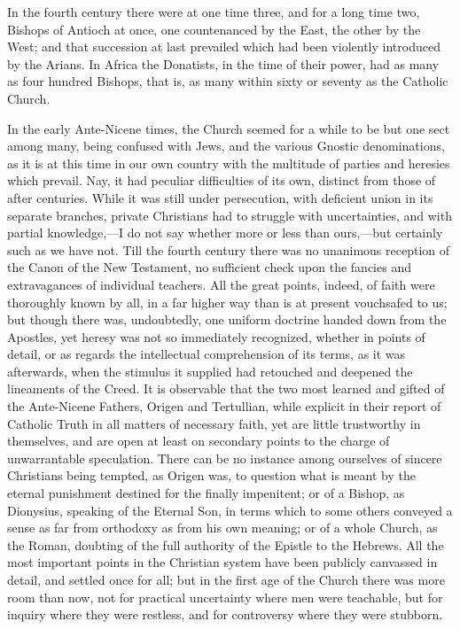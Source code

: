 In the fourth century there were at one time three, and for a long
time two, Bishops of Antioch at once, one countenanced by the East,
the other by the West; and that succession at last prevailed which had
been violently introduced by the Arians. In Africa the Donatists, in
the time of their power, had as many as four hundred Bishops, that is,
as many within sixty or seventy as the Catholic Church.

In the early Ante-Nicene times, the Church seemed for a while to be
but one sect among many, being confused with Jews, and the various
Gnostic denominations, as it is at this time in our own country with
the multitude of parties and heresies which prevail. Nay, it had
peculiar difficulties of its own, distinct from those of after
centuries. While it was still under persecution, with deficient union
in its separate branches, private Christians had to struggle with
uncertainties, and with partial knowledge,—I do not say whether more
or less than ours,—but certainly such as we have not. Till the
fourth century there was no unanimous reception of the Canon of the
New Testament, no sufficient check upon the fancies and extravagances
of individual teachers. All the great points, indeed, of faith were thoroughly known by all, in a far higher way than is at present
vouchsafed to us; but though there was, undoubtedly, one uniform
doctrine handed down from the Apostles, yet heresy was not so
immediately recognized, whether in points of detail, or as regards the
intellectual comprehension of its terms, as it was afterwards, when
the stimulus it supplied had retouched and deepened the lineaments of
the Creed. It is observable that the two most learned and gifted of
the Ante-Nicene Fathers, Origen and Tertullian, while explicit in
their report of Catholic Truth in all matters of necessary faith, yet
are little trustworthy in themselves, and are open at least on
secondary points to the charge of unwarrantable speculation. There can
be no instance among ourselves of sincere Christians being tempted, as
Origen was, to question what is meant by the eternal punishment
destined for the finally impenitent; or of a Bishop, as Dionysius,
speaking of the Eternal Son, in terms which to some others conveyed a
sense as far from orthodoxy as from his own meaning; or of a whole
Church, as the Roman, doubting of the full authority of the Epistle to
the Hebrews. All the most important points in the Christian system
have been publicly canvassed in detail, and settled once for all; but
in the first age of the Church there was more room than now, not for
practical uncertainty where men were teachable, but for inquiry where
they were restless, and for controversy where they were stubborn.

